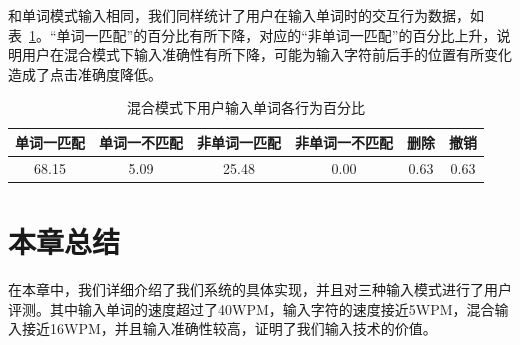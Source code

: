 和单词模式输入相同，我们同样统计了用户在输入单词时的交互行为数据，如表~\ref{tab:hybrid-stat}。“单词一匹配”的百分比有所下降，对应的“非单词一匹配”的百分比上升，说明用户在混合模式下输入准确性有所下降，可能为输入字符前后手的位置有所变化造成了点击准确度降低。

\begin{table}[h]
  \centering
  \begin{minipage}[t]{0.9\linewidth} %
  \caption[混合模式下用户输入单词各行为百分比]{混合模式下用户输入单词各行为百分比}
  \label{tab:hybrid-stat}
    \centering
    \begin{tabularx}{\linewidth}{cccccc}
      \toprule[1.5pt]
      单词一匹配 & 单词一不匹配 & 非单词一匹配 & 非单词一不匹配 & 删除 & 撤销\\\midrule[1pt]
      68.15 & 5.09 & 25.48 & 0.00 & 0.63 & 0.63\\
      \bottomrule[1.5pt]
    \end{tabularx}
  \end{minipage}
\end{table}

\section{本章总结}
在本章中，我们详细介绍了我们系统的具体实现，并且对三种输入模式进行了用户评测。其中输入单词的速度超过了40WPM，输入字符的速度接近5WPM，混合输入接近16WPM，并且输入准确性较高，证明了我们输入技术的价值。
